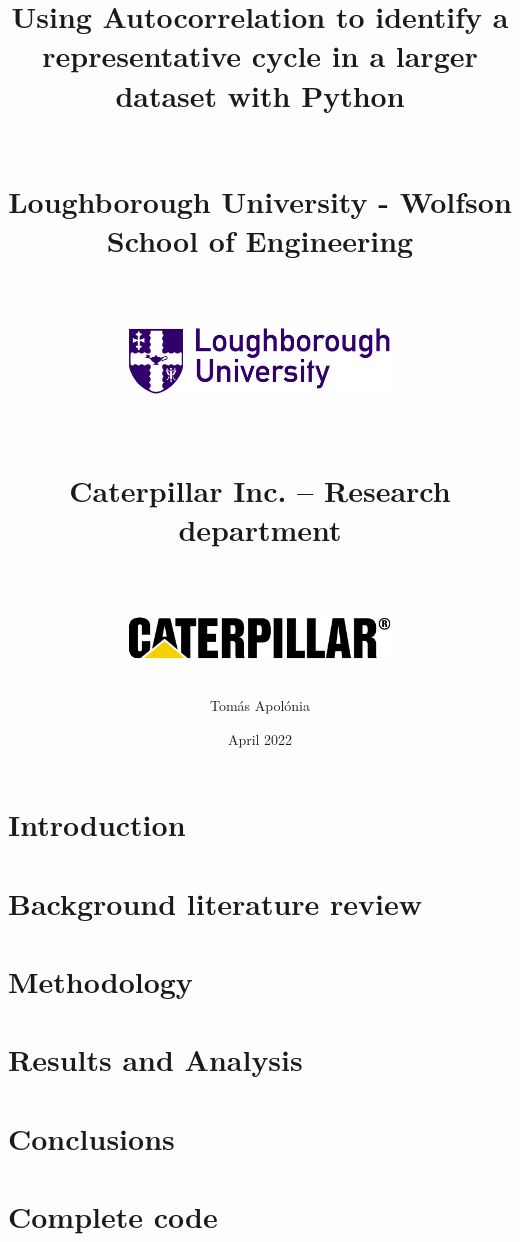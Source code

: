 \documentclass[12pt]{report}
\title{
    {Using Autocorrelation to identify a representative cycle in a larger dataset with Python}\\\
    
    {\large Loughborough University - Wolfson School of Engineering}\\\

    {\includegraphics[width=70mm,scale=0.5]{university.png}}\\\
    
    {\large Caterpillar Inc. – Research department}\\\
    
    {\includegraphics[width=70mm,scale=0.5]{caterpillar.png}}
    
}
\author{Tomás Apolónia}
\date{April 2022}
\begin{document}
\maketitle
\tableofcontents

\chapter{Introduction}


\chapter{Background literature review}


\chapter{Methodology}



\chapter{Results and Analysis}

\chapter{Conclusions}


\appendix
\chapter{Complete code}


\printbibliography
\end{document}

